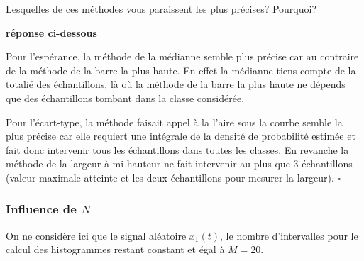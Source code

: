 \documentclass{article}
\newcommand{\debutrep}[1]{\color{blue}\begin{center} \hrulefill \textbf{ #1 } \hrulefill \end{center} }
\newcommand{\finrep}{\vspace*{5mm}\hfill $\square$\color{black}\vspace*{5mm}}
\begin{document}
\newpage
\vspace*{4mm}
Lesquelles de ces méthodes vous paraissent les plus précises? Pourquoi?

\debutrep{réponse ci-dessous}
Pour l'espérance, la méthode de la médianne semble plus précise car au contraire de la méthode de la barre la plus haute. En effet la médianne tiens compte de la totalié des échantillons, là où la méthode de la barre la plus haute ne dépends que des échantillons tombant dans la classe considérée.

Pour l'écart-type, la méthode faisait appel à la l'aire sous la courbe semble la plus précise car elle requiert une intégrale de la densité de probabilité estimée et fait donc intervenir tous les échantillons dans toutes les classes. En revanche la méthode de la largeur à mi hauteur ne fait intervenir au plus que 3 échantillons (valeur maximale atteinte et les deux échantillons pour mesurer la largeur).
\finrep

\subsubsection{Influence de $N$}

On ne considère ici que le signal aléatoire $x_1(t)$, le nombre d'intervalles pour le calcul des histogrammes restant constant et égal à $M=20$. 
\end{document}
